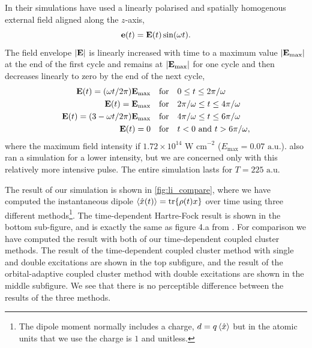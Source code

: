 In their simulations \citeauthor{li2005time} have used a linearly polarised and 
spatially homogenous external field aligned along the $z$-axis, 
\begin{equation}
    \vb{e}(t) = \vb{E}(t)\sin(\omega t).
\end{equation}
The field envelope $|\vb{E}|$ is linearly increased with time to a maximum value 
$|\vb{E}_\text{max}|$ at the end of the first cycle and remains at $|\vb{E}_\text{max}|$
for one cycle and then decreases linearly to zero by the end of the next cycle,
\begin{equation}
    \label{eq:li_laser}
    \begin{aligned}
        \vb{E}(t) = (\omega t / 2\pi) \vb{E}_\text{max} \quad &\text{for} \quad
            0 \leq t \leq 2\pi / \omega \\ 
        \vb{E}(t) = \vb{E}_\text{max} \quad &\text{for} \quad 
            2\pi / \omega \leq t \leq 4\pi / \omega \\ 
        \vb{E}(t) = (3 - \omega t / 2\pi) \vb{E}_\text{max} \quad &\text{for} \quad 
            4\pi / \omega \leq t \leq 6\pi / \omega \\
        \vb{E}(t) = 0 \quad &\text{for} \quad
            t < 0 \text{ and } t > 6\pi / \omega,
    \end{aligned}
\end{equation}
where the maximum field intensity if $1.72\times10^{14} \text{ W cm}^{-2}$ 
($E_\text{max} = 0.07 \text{ a.u.}$). \citeauthor{li2005time} also ran a simulation 
for a lower intensity, but we are concerned only with this relatively more intensive 
pulse. The entire simulation lasts for $T=225 \text{ a.u.}$

The result of our simulation is shown in \autoref{fig:li_compare}, where we have 
computed the instantaneous dipole $\ev{\hat{x}(t)} = \tr{\rho(t)x}$ over time using
three different methods\footnote{The dipole moment normally includes a charge,
$d = q\ev{\hat{x}}$ but in 
the atomic units that we use the charge is $1$ and unitless.}. The 
time-dependent Hartre-Fock result is shown in the bottom sub-figure, and
is exactly the same as figure 4.a from \citeauthor{li2005time} \cite{li2005time}.
For comparison we have computed the result with both of 
our time-dependent coupled cluster methods. The result of the time-dependent 
coupled cluster method with single and double excitations are shown in the top subfigure,
and the result of the orbital-adaptive coupled cluster method with double excitations 
are shown in the middle subfigure. We see that there is no perceptible difference between 
the results of the three methods.

